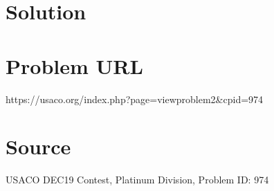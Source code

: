 \documentclass[12pt]{article}
\begin{document}
\section*{Solution}


\section*{Problem URL}
https://usaco.org/index.php?page=viewproblem2&cpid=974

\section*{Source}
USACO DEC19 Contest, Platinum Division, Problem ID: 974
\end{document}
